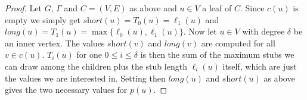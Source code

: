 \documentclass[a4paper,english,numberwithinsect]{eurocg18}
\newcommand{\maxsped}{\ensuremath{\textsc{MaxSPED}}\xspace}
\newcommand{\sollong}{\ensuremath{\textit{long}}\xspace}
\newcommand{\solshort}{\ensuremath{\textit{short}}\xspace}
\begin{document}
\begin{proof}
	Let $ G $, $ \Gamma $ and $ C = (V,E) $ as above and $ u \in V $ a leaf of $ C $. Since $ c(u) $ is empty we simply get $ \solshort(u) = T_0(u) = \ell_1(u) $ and $ \sollong(u) = T_1(u) = \max\{\ell_0(u), \ell_1(u)\} $. Now let $ u \in V $ with degree $ \delta $ be an inner vertex. The values $ \solshort(v) $ and $ \sollong(v) $ are computed for all $ v \in c(u) $. $ T_i(u) $ for one $ 0 \leq i \leq \delta $ is then the sum of the maximum stubs we can draw among the children plus the stub length $ \ell_i(u) $ itself, which are just the values we are interested in. Setting then $ \sollong(u) $ and $ \solshort(u) $ as above gives the two necessary values for $ p(u) $.
	
\end{proof}
\end{document}
